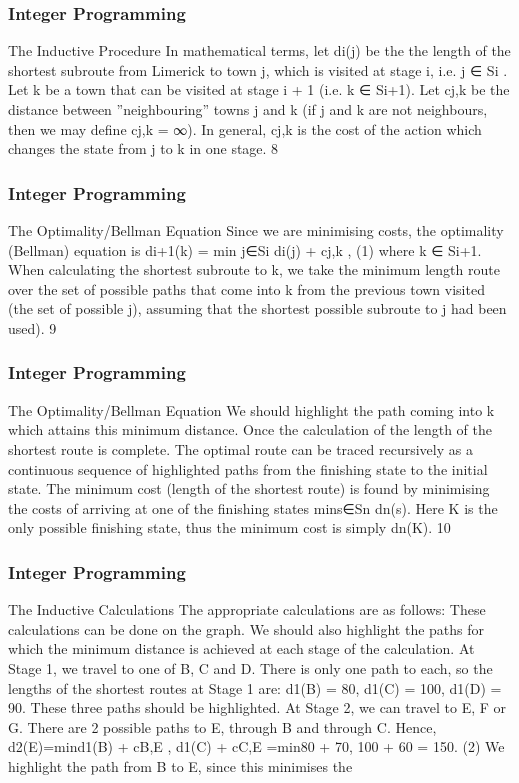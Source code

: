 \begin{frame} 
\frametitle{Integer Programming}     
The Inductive Procedure
In mathematical terms, let di(j) be the the length of the shortest
subroute from Limerick to town j, which is visited at stage i, i.e.
j ∈ Si
.
Let k be a town that can be visited at stage i + 1 (i.e. k ∈ Si+1).
Let cj,k be the distance between ”neighbouring” towns j and k (if
j and k are not neighbours, then we may define cj,k = ∞).
In general, cj,k is the cost of the action which changes the state
from j to k in one stage.
8 \end{frame}  \begin{frame} \frametitle{Integer Programming}     
The Optimality/Bellman Equation
Since we are minimising costs, the optimality (Bellman) equation is
di+1(k) = min
j∈Si
{di(j) + cj,k }, (1)
where k ∈ Si+1.
When calculating the shortest subroute to k, we take the minimum
length route over the set of possible paths that come into k from
the previous town visited (the set of possible j), assuming that the
shortest possible subroute to j had been used).
9 \end{frame}  \begin{frame} \frametitle{Integer Programming}     
The Optimality/Bellman Equation
We should highlight the path coming into k which attains this
minimum distance. Once the calculation of the length of the
shortest route is complete. The optimal route can be traced
recursively as a continuous sequence of highlighted paths from the
finishing state to the initial state.
The minimum cost (length of the shortest route) is found by
minimising the costs of arriving at one of the finishing states
mins∈Sn dn(s). Here K is the only possible finishing state, thus the
minimum cost is simply dn(K).
10 \end{frame}  \begin{frame} \frametitle{Integer Programming}     
The Inductive Calculations
The appropriate calculations are as follows: These calculations can
be done on the graph. We should also highlight the paths for which
the minimum distance is achieved at each stage of the calculation.
At Stage 1, we travel to one of B, C and D. There is only one
path to each, so the lengths of the shortest routes at Stage 1 are:
d1(B) = 80, d1(C) = 100, d1(D) = 90. These three paths should
be highlighted.
At Stage 2, we can travel to E, F or G. There are 2 possible paths
to E, through B and through C. Hence,
d2(E)=min{d1(B) + cB,E , d1(C) + cC,E }
=min{80 + 70, 100 + 60} = 150. (2)
We highlight the path from B to E, since this minimises the

\end{frame}
